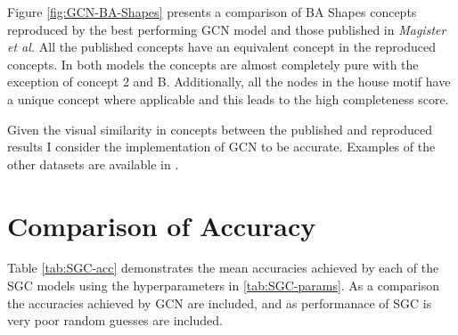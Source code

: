 %

Figure \ref{fig:GCN-BA-Shapes} presents a comparison of BA Shapes concepts reproduced by the best performing GCN model and those published in \textit{Magister et al.}
All the published concepts have an equivalent concept in the reproduced concepts.
In both models the concepts are almost completely pure with the exception of concept 2 and B.
Additionally, all the nodes in the house motif have a unique concept where applicable and this leads to the high completeness score.

Given the visual similarity in concepts between the published and reproduced results I consider the implementation of GCN to be accurate.
Examples of the other datasets are available in .

\section{Comparison of Accuracy}
\label{sec:comp-acc}


Table \ref{tab:SGC-acc} demonstrates the mean accuracies achieved by each of the SGC models using the hyperparameters in \ref{tab:SGC-params}.
As a comparison the accuracies achieved by GCN are included, and as performanace of SGC is very poor random guesses are included.

